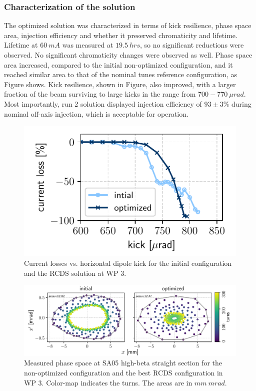 \subsubsection{Characterization of the solution}
The optimized solution was characterized in terms of kick resilience, phase space area, injection efficiency and whether it preserved chromaticity and lifetime.  Lifetime at $60~\unit{mA}$ was measured at $19.5~\unit{hrs}$, so no significant reductions were observed. No significant chromaticity changes were observed as well. Phase space area increased, compared to the initial non-optimized configuration, and it reached similar area to that of the nominal tunes reference configuration, as Figure shows. Kick resilience, shown in Figure, also improved, with a larger fraction of the beam surviving to large kicks in the range from $700-770~\unit{\mu rad}$. Most importantly, run 2 solution displayed injection efficiency of $93\pm3\%$ during nominal off-axis injection, which is acceptable for operation.
\begin{figure}[tb]
    \centering
    \includegraphics[width=0.7\columnwidth]{Images/wp3_kick_resilience.pdf}
    \caption[Current losses vs. horizontal dipole kick for the initial configuration and the RCDS solution at WP 3.]{Current losses vs. horizontal dipole kick for the initial configuration and the RCDS solution at WP 3.}
    \hfill
\end{figure}
\begin{figure}[tb]
    \centering
    \includegraphics[width=\textwidth]{Images/wp3_phase_space.pdf}
    \caption[Measured phase space at SA05 high-beta straight section for the non-optimized configuration and the best RCDS configuration in WP 3.]{Measured phase space at SA05 high-beta straight section for the non-optimized configuration and the best RCDS configuration in WP 3. Color-map indicates the turns. The areas are in $\unit{mm}~\unit{mrad}$.}
\end{figure}
